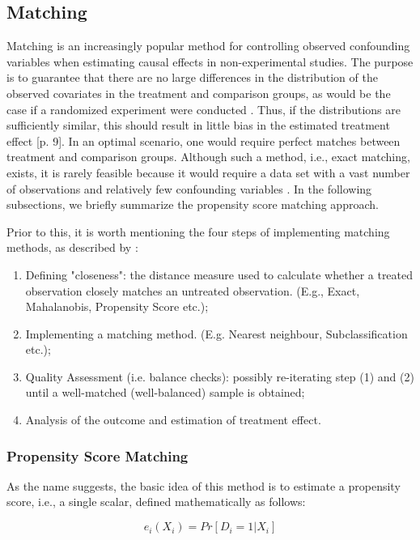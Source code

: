 \subsection{Matching}
Matching is an increasingly popular method for controlling observed confounding variables when estimating causal effects in non-experimental studies. The purpose is to guarantee that there are no large differences in the distribution of the observed covariates in the treatment and comparison groups, as would be the case if a randomized experiment were conducted \citep[p. 2]{stuart2008using}.
Thus, if the distributions are sufficiently similar, this should result in little bias in the estimated treatment effect [p. 9].
In an optimal scenario, one would require perfect matches between treatment and comparison groups. Although such a method, i.e., exact matching, exists, it is rarely feasible because it would require a data set with a vast number of observations and relatively few confounding variables \citep[p. 602]{bekes2021data}. In the following subsections, we briefly summarize the propensity score matching approach.

Prior to this, it is worth mentioning the four steps of implementing matching methods, as described by \citet[pp. 5ff.]{stuart2010matching}:

\begin{enumerate}
    \item Defining "closeness": the distance measure used to calculate whether a treated observation closely matches an untreated observation. (E.g., Exact, Mahalanobis, Propensity Score etc.);
    \item Implementing a matching method. (E.g. Nearest neighbour, Subclassification etc.);
    \item Quality Assessment (i.e. balance checks): possibly re-iterating step (1) and (2) until a well-matched (well-balanced) sample is obtained;
    \item Analysis of the outcome and estimation of treatment effect.
\end{enumerate}

\subsubsection*{Propensity Score Matching}
As the name suggests, the basic idea of this method is to estimate a propensity score, i.e., a single scalar, defined mathematically as follows:

\begin{equation}
    e_i (X_i) = Pr[D_i = 1 | X_i]
\end{equation}

